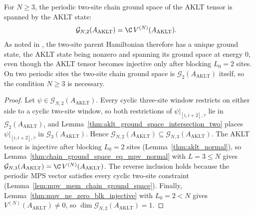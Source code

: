 \begin{lemma}
    \label{thm:aklt_chain_ground_space_two}
    \leanok
    For $N\ge3$, the periodic two-site chain ground space of the AKLT tensor
    is spanned by the AKLT state:
    \begin{align}
        \mathcal G_{N,2}(A_{\mathrm{AKLT}})
         & = \C\,V^{(N)}(A_{\mathrm{AKLT}}).
        \notag
    \end{align}
    As noted in \cite[line~2095]{Cirac2021Matrix}, the two-site parent
    Hamiltonian therefore has a unique ground state, the AKLT state being
    nonzero and spanning its ground space at energy $0$, even though the AKLT
    tensor becomes injective only after blocking $L_0 = 2$ sites. On two
    periodic sites the two-site chain ground space is
    $\mathcal G_2(A_{\mathrm{AKLT}})$ itself, so the condition $N\ge3$ is
    necessary.
\end{lemma}

\begin{proof}
    \leanok
    Let $\psi\in\mathcal G_{N,2}(A_{\mathrm{AKLT}})$. Every cyclic three-site
    window restricts on either side to a cyclic two-site window, so both
    restrictions of $\psi|_{[i,i+2],\tau}$ lie in
    $\mathcal G_2(A_{\mathrm{AKLT}})$, and
    Lemma~\ref{thm:aklt_ground_space_intersection_two} places
    $\psi|_{[i,i+2],\tau}$ in $\mathcal G_3(A_{\mathrm{AKLT}})$. Hence
    $\mathcal G_{N,2}(A_{\mathrm{AKLT}})\subseteq\mathcal G_{N,3}(A_{\mathrm{AKLT}})$.
    The AKLT tensor is injective after blocking $L_0 = 2$ sites
    (Lemma~\ref{thm:aklt_normal}), so
    Lemma~\ref{thm:chain_ground_space_eq_mpv_normal} with $L = 3\le N$ gives
    $\mathcal G_{N,3}(A_{\mathrm{AKLT}}) = \C\,V^{(N)}(A_{\mathrm{AKLT}})$.
    The reverse inclusion holds because the periodic MPS vector satisfies
    every cyclic two-site constraint
    (Lemma~\ref{lem:mpv_mem_chain_ground_space}). Finally,
    Lemma~\ref{thm:mpv_ne_zero_blk_injective} with $L_0 = 2 < N$ gives
    $V^{(N)}(A_{\mathrm{AKLT}})\ne0$, so
    $\dim\mathcal G_{N,2}(A_{\mathrm{AKLT}}) = 1$.
\end{proof}

